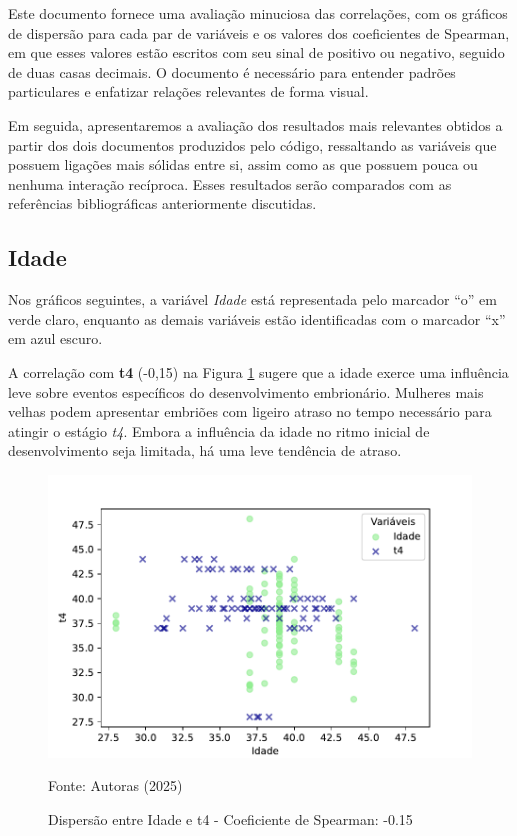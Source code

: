 Este documento fornece uma avaliação minuciosa das correlações, com os gráficos de dispersão para cada par de variáveis e os valores dos coeficientes de Spearman, em que esses valores estão escritos com seu sinal de positivo ou negativo, seguido de duas casas decimais. O documento é necessário para entender padrões particulares e enfatizar relações relevantes de forma visual.

Em seguida, apresentaremos a avaliação dos resultados mais relevantes obtidos a partir dos dois documentos produzidos pelo código, ressaltando as variáveis que possuem ligações mais sólidas entre si, assim como as que possuem pouca ou nenhuma interação recíproca. Esses resultados serão comparados com as referências bibliográficas anteriormente discutidas.


\subsection*{Idade}

Nos gráficos seguintes, a variável \textit{Idade} está representada pelo marcador “o” em verde claro, enquanto as demais variáveis estão identificadas com o marcador “x” em azul escuro. 

A correlação com \textbf{t4} (-0,15) na Figura \ref{fig:idade-t4} sugere que a idade exerce uma influência leve sobre eventos específicos do desenvolvimento embrionário. Mulheres mais velhas podem apresentar embriões com ligeiro atraso no tempo necessário para atingir o estágio \textit{t4}. Embora a influência da idade no ritmo inicial de desenvolvimento seja limitada, há uma leve tendência de atraso.

\begin{figure}[h]
    \captionsetup{font=footnotesize, justification=centering, labelsep=period, position=above}
    \caption{Dispersão entre Idade e t4 - Coeficiente de Spearman: -0.15}
    \label{fig:idade-t4}
    \centering
    \includegraphics[scale=0.3]{figuras/Spearman/idade-t4.pdf}
    \vspace{0.3cm} 
    \begin{minipage}{\linewidth}
        \centering
        \scriptsize{Fonte: Autoras (2025)}
    \end{minipage}
\end{figure}
\FloatBarrier

